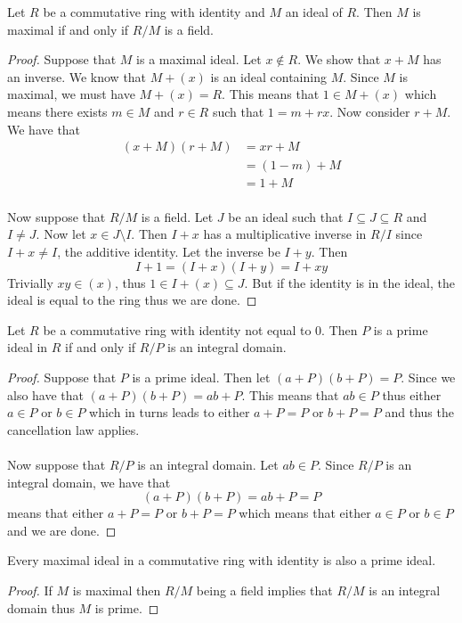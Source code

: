\documentclass[a4paper]{article}
\begin{document}
\begin{prp}{}{} Let $R$ be a commutative ring with identity and $M$ an ideal of $R$. Then $M$ is maximal if and only if $R/M$ is a field. \tcbline
\begin{proof}
Suppose that $M$ is a maximal ideal. Let $x\notin R$. We show that $x+M$ has an inverse. We know that $M+(x)$ is an ideal containing $M$. Since $M$ is maximal, we must have $M+(x)=R$. This means that $1\in M+(x)$ which means there exists $m\in M$ and $r\in R$ such that $1=m+rx$. Now consider $r+M$. We have that 
\begin{align*}
(x+M)(r+M)&=xr+M\\
&=(1-m)+M\\
&=1+M
\end{align*}~\\
Now suppose that $R/M$ is a field. Let $J$ be an ideal such that $I\subseteq J\subseteq R$ and $I\neq J$. Now let $x\in J\setminus I$. Then $I+x$ has a multiplicative inverse in $R/I$ since $I+x\neq I$, the additive identity. Let the inverse be $I+y$. Then $$I+1=(I+x)(I+y)=I+xy$$ Trivially $xy\in(x)$, thus $1\in I+(x)\subseteq J$. But if the identity is in the ideal, the ideal is equal to the ring thus we are done. 
\end{proof}
\end{prp}

\begin{prp}{}{} Let $R$ be a commutative ring with identity not equal to $0$. Then $P$ is a prime ideal in $R$ if and only if $R/P$ is an integral domain. \tcbline
\begin{proof}
Suppose that $P$ is a prime ideal. Then let $(a+P)(b+P)=P$. Since we also have that $(a+P)(b+P)=ab+P$. This means that $ab\in P$ thus either $a\in P$ or $b\in P$ which in turns leads to either $a+P=P$ or $b+P=P$ and thus the cancellation law applies. \\~\\
Now suppose that $R/P$ is an integral domain. Let $ab\in P$. Since $R/P$ is an integral domain, we have that $$(a+P)(b+P)=ab+P=P$$ means that either $a+P=P$ or $b+P=P$ which means that either $a\in P$ or $b\in P$ and we are done. 
\end{proof}
\end{prp}

\begin{crl}{}{} Every maximal ideal in a commutative ring with identity is also a prime ideal. \tcbline
\begin{proof}
If $M$ is maximal then $R/M$ being a field implies that $R/M$ is an integral domain thus $M$ is prime. 
\end{proof}
\end{crl}
\end{document}
